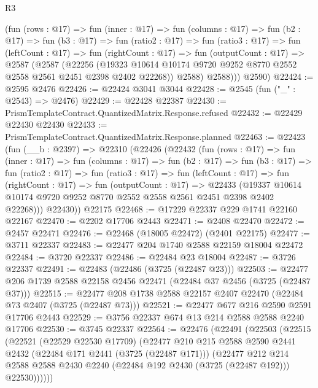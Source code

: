 \begin{lexlean}{R3}
\begin{coremodule}
          (fun (rows : @17) =>
          fun (inner : @17) =>
          fun (columns : @17) =>
          fun (b2 : @17) =>
          fun (b3 : @17) =>
          fun (ratio2 : @17) =>
          fun (ratio3 : @17) =>
          fun (leftCount : @17) =>
          fun (rightCount : @17) =>
          fun (outputCount : @17) =>
          @2587
            (@2587
              (@22256
                (@19323 @10614 @10174 @9720 @9252 @8770 @2552 @2558 @2561 @2451 @2398 @2402 @22268))
              @2588)
            @2588)))
      @2590)
@22424 := @2595 @2476
@22426 := @22424 @3041 @3044
@22428 := @2545 (fun ("_" : @2543) => @2476)
@22429 := @22428 @22387
@22430 := PrismTemplateContract.QuantizedMatrix.Response.refused
@22432 := @22429 @22430 @22430
@22433 := PrismTemplateContract.QuantizedMatrix.Response.planned
@22463 := @22423
    (fun (__b : @2397) =>
    @22310
      (@22426
        (@22432
          (fun (rows : @17) =>
          fun (inner : @17) =>
          fun (columns : @17) =>
          fun (b2 : @17) =>
          fun (b3 : @17) =>
          fun (ratio2 : @17) =>
          fun (ratio3 : @17) =>
          fun (leftCount : @17) =>
          fun (rightCount : @17) =>
          fun (outputCount : @17) =>
          @22433
            (@19337 @10614 @10174 @9720 @9252 @8770 @2552 @2558 @2561 @2451 @2398 @2402 @22268)))
        @22430))
    @22175
@22468 := @17229 @22337 @229 @1741 @22160 @22167
@22470 := @2202 @17706 @2443
@22471 := @2408 @22470
@22472 := @2457 @22471
@22476 := @22468 (@18005 @22472) (@2401 @22175)
@22477 := @3711 @22337
@22483 := @22477 @204 @1740 @2588 @22159 @18004 @22472
@22484 := @3720 @22337
@22486 := @22484 @23 @18004
@22487 := @3726 @22337
@22491 := @22483 (@22486 (@3725 (@22487 @23)))
@22503 := @22477 @206 @1739 @2588 @22158 @2456 @22471 (@22484 @37 @2456 (@3725 (@22487 @37)))
@22515 := @22477 @208 @1738 @2588 @22157 @2407 @22470 (@22484 @73 @2407 (@3725 (@22487 @73)))
@22521 := @22477 @677 @216 @2590 @2591 @17706 @2443
@22529 := @3756 @22337 @674 @13 @214 @2588 @2588 @2240 @17706
@22530 := @3745 @22337
@22564 := @22476
    (@22491
      (@22503
        (@22515
          (@22521
            (@22529 @22530 @17709)
            (@22477
              @210
              @215
              @2588
              @2590
              @2441
              @2432
              (@22484 @171 @2441 (@3725 (@22487 @171)))
              (@22477
                @212
                @214
                @2588
                @2588
                @2430
                @2240
                (@22484 @192 @2430 (@3725 (@22487 @192)))
                @22530))))))

\end{coremodule}
\end{lexlean}

